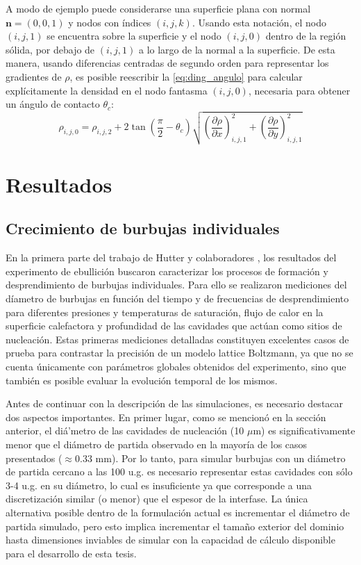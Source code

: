 A modo de ejemplo puede considerarse una superficie plana con normal $\bm{n} = (0,0,1)$ y nodos con \'indices $(i,j,k)$. Usando esta notaci\'on, el nodo $(i,j,1)$ se encuentra sobre la superficie y el nodo $(i,j,0)$ dentro de la regi\'on s\'olida, por debajo de $(i,j,1)$ a lo largo de la normal a la superficie. De esta manera, usando diferencias centradas de segundo orden para representar los gradientes de $\rho$, es posible reescribir la \eqref{eq:ding_angulo} para calcular expl\'icitamente la densidad en el nodo fantasma $(i,j,0)$, necesaria para obtener un \'angulo de contacto $\theta_c$:
\begin{equation}
	\rho_{i,j,0} = \rho_{i,j,2} + 2 \tan \left( \dfrac{\pi}{2} - \theta_c \right) \sqrt{\left( \dfrac{\partial \rho}{\partial x} \right)_{i,j,1}^2 + \left( \dfrac{\partial \rho}{\partial y} \right)_{i,j,1}^2}  
\end{equation}



\section{Resultados}

\subsection{Crecimiento de burbujas individuales}

En la primera parte del trabajo de Hutter y colaboradores \cite{hutter_experimental_2010}, los resultados del experimento de ebullici\'on buscaron caracterizar los procesos de formaci\'on y desprendimiento de burbujas individuales. Para ello se realizaron mediciones del d\'iametro de burbujas en funci\'on del tiempo y de frecuencias de desprendimiento para diferentes presiones y temperaturas de saturaci\'on, flujo de calor en la superficie calefactora y profundidad de las cavidades que act\'uan como sitios de nucleaci\'on. Estas primeras mediciones detalladas constituyen excelentes casos de prueba para contrastar la precisi\'on de un modelo lattice Boltzmann, ya que no se cuenta \'unicamente con par\'ametros globales obtenidos del experimento, sino que tambi\'en es posible evaluar la evoluci\'on temporal de los mismos.

Antes de continuar con la descripci\'on de las simulaciones, es necesario destacar dos aspectos importantes. En primer lugar, como se mencion\'o en la secci\'on anterior, el di\'a'metro de las cavidades de nucleaci\'on (10 $\mu$m) es significativamente menor que el di\'ametro de partida observado en la mayor\'ia de los casos presentados ($\approx0.33$ mm). Por lo tanto, para simular burbujas con un di\'ametro de partida cercano a las 100 u.g. es necesario representar estas cavidades con s\'olo 3-4 u.g. en su di\'ametro, lo cual es insuficiente ya que corresponde a una discretizaci\'on similar (o menor) que el espesor de la interfase. La \'unica alternativa posible dentro de la formulaci\'on actual es incrementar el di\'ametro de partida simulado, pero esto implica incrementar el tama\~no exterior del dominio hasta dimensiones inviables de simular con la capacidad de c\'alculo disponible para el desarrollo de esta tesis.

